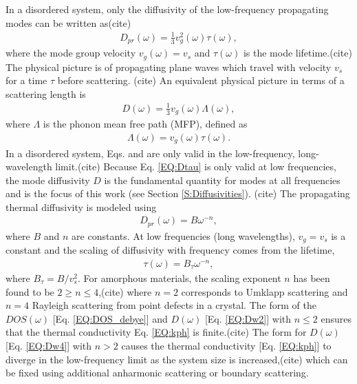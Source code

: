 \documentclass[aps,prb,onecolumn,preprint,superscriptaddress,footinbib,amsmath,amssymb,floatfix]{revtex4}
\begin{document}
In a disordered system, only the diffusivity of the low-frequency 
propagating modes can be written as(cite)     
\begin{equation}\label{EQ:Dtau}
\begin{split}
D_{pr}(\omega) = \frac{1}{3}v^2_g(\omega)\tau(\omega),
\end{split}
\end{equation}
where the mode group velocity $v_g(\omega) = v_s$ and $\tau(\omega)$ is 
the mode lifetime.(cite)  
The physical picture is of propagating plane waves which 
travel with velocity $v_s$ for a time $\tau$ before scattering.
(cite) 
An equivalent physical picture in terms of a scattering length 
is
\begin{equation}\label{EQ:DLambda}
\begin{split}
D(\omega) = \frac{1}{3}v_g(\omega) \Lambda(\omega),
\end{split}
\end{equation}
where $\Lambda$ is the phonon mean free path (MFP), defined as 
\begin{equation}\label{EQ:Lambda}
\begin{split}
\Lambda(\omega) = v_{g}(\omega) \tau(\omega).
\end{split}
\end{equation}
In a disordered system, Eqs. and are only valid in the 
low-frequency, long-wavelength limit.(cite) 
Because Eq. \eqref{EQ:Dtau} is only valid at low frequencies, 
the mode diffusivity $D$ is the fundamental quantity for modes at all 
frequencies and is the focus of this work (see Section \ref{S:Diffusivities}).
(cite) 
The propagating thermal diffusivity is modeled using 
\begin{equation}\label{EQ:Dw2}
\begin{split}
D_{pr}(\omega) = B\omega^{-n}, 
\end{split}
\end{equation}
where $B$ and $n$ are constants.   
At low frequencies (long wavelengths), $v_g = v_s$ is a constant 
and the scaling of 
diffusivity with frequency comes from the lifetime, 
\begin{equation}\label{EQ:tauw2}
\begin{split}
\tau(\omega) = B_{\tau} \omega^{-n},
\end{split}
\end{equation}
where $B_{\tau} = B/v_s^2$. For amorphous materials, the scaling exponent $n$ 
has been found to be $2\ge n \le 4$,(cite) 
where $n=2$ corresponds to 
Umklapp scattering\cite{callaway_model_1959} and $n=4$ Rayleigh scattering 
from point defects in a crystal.\cite{klemens_scattering_1955}
The form of the $DOS(\omega)$ [Eq. \eqref{EQ:DOS_debye}] 
and $D(\omega)$ [Eq. \eqref{EQ:Dw2}] with $n\le2$  
ensures that the 
thermal conductivity Eq. \eqref{EQ:kph} is finite.(cite) The form for $D(\omega)$ 
[Eq. \eqref{EQ:Dw4}] with $n>2$ causes the thermal conductivity 
[Eq. \eqref{EQ:kph}] to diverge 
in the low-frequency limit as the system size is increased,(cite) 
which can be fixed using additional anharmonic scattering
\cite{feldman_thermal_1993,feldman_numerical_1999} or 
boundary scattering.\cite{cahill_lower_1994,liu_high_2009,yang_anomalously_2010}
\end{document}
